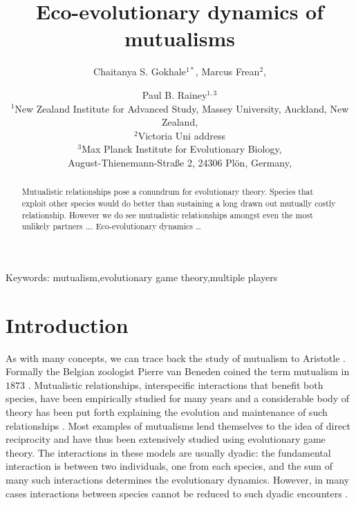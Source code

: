 \documentclass[12pt]{article}
\title{\vspace*{-22mm}\bf Eco-evolutionary dynamics of mutualisms}
\author{Chaitanya S. Gokhale$^{1*}$,
Marcus Frean$^{2}$,
 \and Paul B. Rainey$^{1,3}$ \\
\normalsize $^{1}$New Zealand Institute for Advanced Study, Massey University, Auckland, New Zealand, \\
\normalsize $^2$Victoria Uni address\\
\normalsize $^3$Max Planck Institute for Evolutionary Biology, \\
\normalsize August-Thienemann-Stra{\ss}e 2, 24306 Pl\"{o}n, Germany,\\
}
\date{}
\begin{document}
\linenumbers
\maketitle

\begin{abstract}
Mutualistic relationships pose a conundrum for evolutionary theory.
Species that exploit other species would do better than sustaining a long drawn out mutually costly relationship. However we do see mutualistic relationships amongst even the most unlikely partners \ldots.
Eco-evolutionary dynamics \ldots
\end{abstract}

\noindent
Keywords: mutualism,evolutionary game theory,multiple players

\tableofcontents

\section{Introduction}

As with many concepts, we can trace back the study of mutualism to Aristotle \citep{aristotle:book:350}.
Formally the Belgian zoologist Pierre van Beneden coined the term mutualism in $1873$ \citep{bronstein:book:2003}.
Mutualistic relationships, interspecific interactions that benefit both species, have been empirically studied for many years 
\citep{boucher:book:1985,hinton:PTENHS:1951,wilson:AmNat:1983,bronstein:QRB:1994,pierce:ARE:2002,kiers:Nature:2003,bshary:ASB:2004} and a considerable body of theory has been put forth explaining the evolution and maintenance of such relationships \citep{poulin:JTB:1995,doebeli:PNAS:1998,noe:book:2001,johnstone:ECL:2002,bergstrom:PNAS:2003,hoeksema:AmNat:2003,akcay:PRSB:2007,bshary:Nature:2008}.
Most examples of mutualisms lend themselves to the idea of direct reciprocity \citep{trivers:QRB:1971} and have thus been extensively studied using evolutionary game theory.
The interactions in these models are usually dyadic: the fundamental interaction is between two individuals, one from each species, and the sum of many such interactions determines the evolutionary dynamics.
However, in many cases interactions between species cannot be reduced to such dyadic encounters \citep{stadler:book:2008}.
\end{document}
